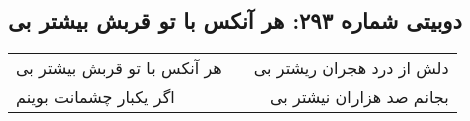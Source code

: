 \begin{center}
\section*{دوبیتی شماره ۲۹۳: هر آنکس با تو قربش بیشتر بی}
\label{sec:293}
\begin{longtable}{l p{0.5cm} r}
هر آنکس با تو قربش بیشتر بی
&&
دلش از درد هجران ریشتر بی
\\
اگر یکبار چشمانت بوینم
&&
بجانم صد هزاران نیشتر بی
\\
\end{longtable}
\end{center}
